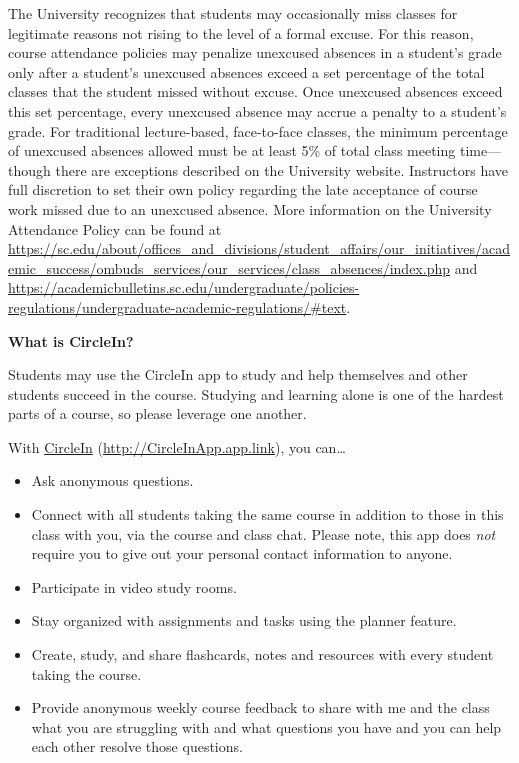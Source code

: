 \documentclass[11pt,letterpaper]{article}
\begin{document}
The University recognizes that students may occasionally miss classes for legitimate reasons not rising to the level of a formal excuse. For this reason, course attendance policies may penalize unexcused absences in a student's grade only after a student's unexcused absences exceed a set percentage of the total classes that the student missed without excuse. Once unexcused absences exceed this set percentage, every unexcused absence may accrue a penalty to a student’s grade. For traditional lecture-based, face-to-face classes, the minimum percentage of unexcused absences allowed must be at least 5\% of total class meeting time---though there are exceptions described on the University website. Instructors have full discretion to set their own policy regarding the late acceptance of course work missed due to an unexcused absence. More information on the University Attendance Policy can be found at \url{https://sc.edu/about/offices_and_divisions/student_affairs/our_initiatives/academic_success/ombuds_services/our_services/class_absences/index.php} and \url{https://academicbulletins.sc.edu/undergraduate/policies-regulations/undergraduate-academic-regulations/\#text}. 
\sectionbreak




{\bfseries What is CircleIn?} \par
Students may use the CircleIn app to study and help themselves and other students succeed in the course. Studying and learning alone is one of the hardest parts of a course, so please leverage one another. \par\vspace{0.3cm}

With \href{http://CircleInApp.app.link}{CircleIn} (\url{http://CircleInApp.app.link}), you can\dots
	\begin{itemize}
	\item Ask anonymous questions.
	\item Connect with all students taking the same course in addition to those in this class with you, via the course and class chat. Please note, this app does {\itshape not} require you to give out your personal contact information to anyone.
	\item Participate in video study rooms.
	\item Stay organized with assignments and tasks using the planner feature.
	\item Create, study, and share flashcards, notes and resources with every student taking the course.
	\item Provide anonymous weekly course feedback to share with me and the class what you are struggling with and what questions you have and you can help each other resolve those questions. 
	\end{itemize}
\end{document}
